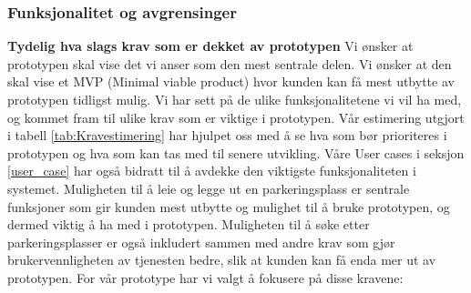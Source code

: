 \subsubsection{Funksjonalitet og avgrensinger} 
\textbf{Tydelig hva slags krav som er dekket av prototypen }
Vi ønsker at prototypen skal vise det vi anser som den mest sentrale delen. Vi ønsker at den skal vise et MVP (Minimal viable product) hvor kunden kan få mest utbytte av prototypen tidligst mulig. Vi har sett på de ulike funksjonalitetene vi vil ha med, og kommet fram til ulike krav som er viktige i prototypen. Vår estimering utgjort i tabell \ref{tab:Kravestimering} har hjulpet oss med å se hva som bør prioriteres i prototypen og hva som kan tas med til senere utvikling. Våre User cases i seksjon \ref{user_case} har også bidratt til å avdekke den viktigste funksjonaliteten i systemet. Muligheten til å leie og legge ut en parkeringsplass er sentrale funksjoner som gir kunden mest utbytte og mulighet til å bruke prototypen, og dermed viktig å ha med i prototypen. Muligheten til å søke etter parkeringsplasser er også inkludert sammen med andre krav som gjør brukervennligheten av tjenesten bedre, slik at kunden kan få enda mer ut av prototypen. For vår prototype har vi valgt å fokusere på disse kravene:   

